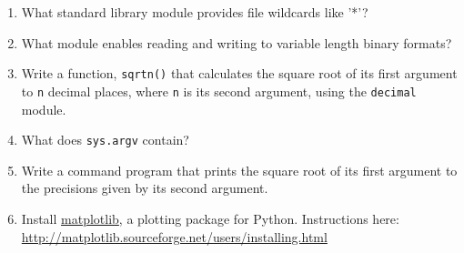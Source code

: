 \begin{enumerate}
	\item What standard library module provides file wildcards like '*'?
	\item What module enables reading and writing to variable length binary formats?
	\item Write a function, \verb|sqrtn()| that calculates the square root of its first argument to \verb|n| decimal places, where \verb|n| is its second argument, using the \verb|decimal| module.
	\item What does \verb|sys.argv| contain?
	\item Write a command program that prints the square root of its first argument to the precisions given by its second argument.
	\item Install \href{http://matplotlib.sourceforge.net/}{matplotlib}, a plotting package for Python. Instructions here: \url{http://matplotlib.sourceforge.net/users/installing.html}

\end{enumerate}